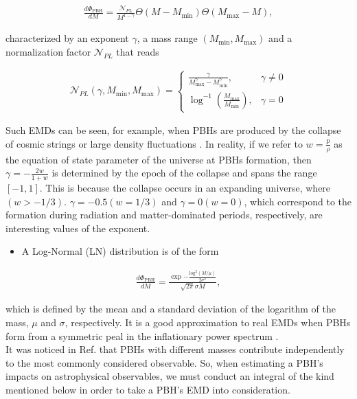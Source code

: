 \begin{align}
    \frac{d \Phi_{\mathrm{PBH}}}{d M}=\frac{\mathcal{N}_{P L}}{M^{1-\gamma}} \Theta\left(M-M_{\min }\right) \Theta\left(M_{\max }-M\right), \label{4.12}
\end{align}


characterized by an exponent $\gamma$, a mass range $\left(M_{\min }, M_{\max }\right)$ and a normalization factor $\mathcal{N}_{P L}$ that reads

\begin{align}
    \mathcal{N}_{P L}\left(\gamma, M_{\min }, M_{\max }\right)= \begin{cases}\frac{\gamma}{M_{\max }^{\gamma}-M_{\min }^{\gamma}}, & \gamma \neq 0 \\ \log ^{-1}\left(\frac{M_{\max }}{M_{\min }}\right), & \gamma=0\end{cases} \label{4.13}
\end{align}

Such EMDs can be seen, for example, when PBHs are produced by the collapse of cosmic strings \cite{Hawking:1982ga} or large density fluctuations \cite{1975ApJ...201....1C}. In reality, if we refer to $w=\frac{p}{\rho}$ as the equation of state parameter of the universe at PBHs formation, then $\gamma=-\frac{2 w}{1+w}$ is determined by the epoch of the collapse and spans the range $[-1,1]$. This is because the collapse occurs in an expanding universe, where $(w>-1 / 3)$. $\gamma=-0.5(w=1 / 3)$ and $\gamma=0(w=0)$, which correspond to the formation during radiation and matter-dominated periods, respectively, are interesting values of the exponent.

\begin{itemize}
  \item A Log-Normal (LN) distribution is of the form
\end{itemize}


\begin{align}
    \frac{d \Phi_{\mathrm{PBH}}}{d M}= \frac{\exp{-\frac{\mathrm{log}^{2}(M/\mu)}{2\sigma^{2}}}}{\sqrt{2\pi}\sigma M},\label{4.14}
\end{align}

which is defined by the mean and a standard deviation of the logarithm of the mass, $\mu$ and $\sigma$, respectively. It is a good approximation to real EMDs when PBHs form from a symmetric peal in the inflationary power spectrum \cite{Green:2016xgy}. \\

It was noticed in Ref. \cite{Carr:2017jsz} that PBHs with different masses contribute independently to the most commonly considered observable. So, when estimating a PBH's impacts on astrophysical observables, we must conduct an integral of the kind mentioned below in order to take a PBH's EMD into consideration.


